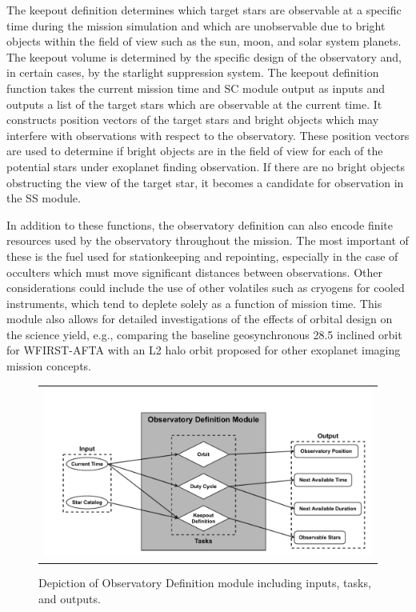 \documentclass[cleanfoot]{asme2ej}
\begin{document}
The keepout definition determines which target stars are observable at a specific time during the mission simulation and which are unobservable due to bright objects within the field of view such as the sun, moon, and solar system planets.  The keepout volume is determined by the specific design of the observatory and, in certain cases, by the starlight suppression system.  The keepout definition function takes the current mission time and SC module output as inputs and outputs a list of the target stars which are observable at the current time. It constructs position vectors of the target stars and bright objects which may interfere with observations with respect to the observatory. These position vectors are used to determine if bright objects are in the field of view for each of the potential stars under exoplanet finding observation.  If there are no bright objects obstructing the view of the target star, it becomes a candidate for observation in the SS module.

In addition to these functions, the observatory definition can also encode finite resources used by the observatory throughout the mission.  The most important of these is the fuel used for stationkeeping and repointing, especially in the case of occulters which must move significant distances between observations.  Other considerations could include the use of other volatiles such as cryogens for cooled instruments, which tend to deplete solely as a function of mission time.  This module also allows for detailed investigations of the effects of orbital design on the science yield, e.g., comparing the baseline geosynchronous 28.5\textdegree{} inclined orbit for WFIRST-AFTA with an L2 halo orbit proposed for other exoplanet imaging mission concepts. 

\begin{figure}[ht]
    \begin{center}
        \begin{tabular}{c}
             \includegraphics[width=\textwidth]{observatory2}
        \end{tabular}
    \end{center}
    \caption{\label{fig:observatory} Depiction of Observatory Definition module including inputs, tasks, and outputs.}
\end{figure}
\end{document}
